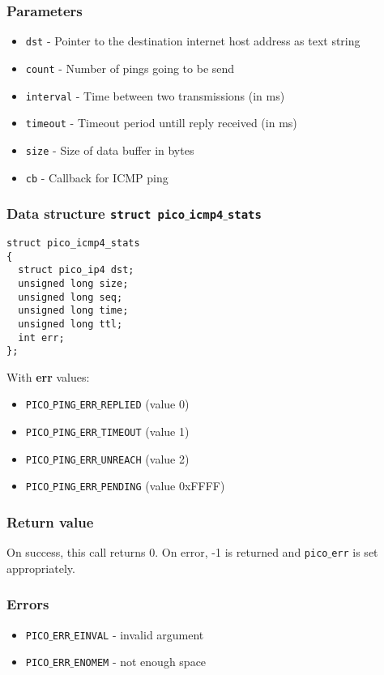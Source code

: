 \subsubsection*{Parameters}
\begin{itemize}[noitemsep]
\item \texttt{dst} - Pointer to the destination internet host address as text string
\item \texttt{count} - Number of pings going to be send
\item \texttt{interval} - Time between two transmissions (in ms)
\item \texttt{timeout} - Timeout period untill reply received (in ms)
\item \texttt{size} - Size of data buffer in bytes
\item \texttt{cb} - Callback for ICMP ping
\end{itemize}

\subsubsection*{Data structure \texttt{struct pico$\_$icmp4$\_$stats}}
\begin{verbatim}
struct pico_icmp4_stats
{
  struct pico_ip4 dst;
  unsigned long size;
  unsigned long seq;
  unsigned long time;
  unsigned long ttl;
  int err;
};
\end{verbatim}
With \textbf{err} values:
\begin{itemize}[noitemsep]
\item \texttt{PICO$\_$PING$\_$ERR$\_$REPLIED} (value 0)
\item \texttt{PICO$\_$PING$\_$ERR$\_$TIMEOUT} (value 1)
\item \texttt{PICO$\_$PING$\_$ERR$\_$UNREACH} (value 2)
\item \texttt{PICO$\_$PING$\_$ERR$\_$PENDING} (value 0xFFFF)
\end{itemize}

\subsubsection*{Return value}
On success, this call returns 0.
On error, -1 is returned and \texttt{pico$\_$err} is set appropriately.

\subsubsection*{Errors}
\begin{itemize}[noitemsep]
\item \texttt{PICO$\_$ERR$\_$EINVAL} - invalid argument
\item \texttt{PICO$\_$ERR$\_$ENOMEM} - not enough space
\end{itemize}

